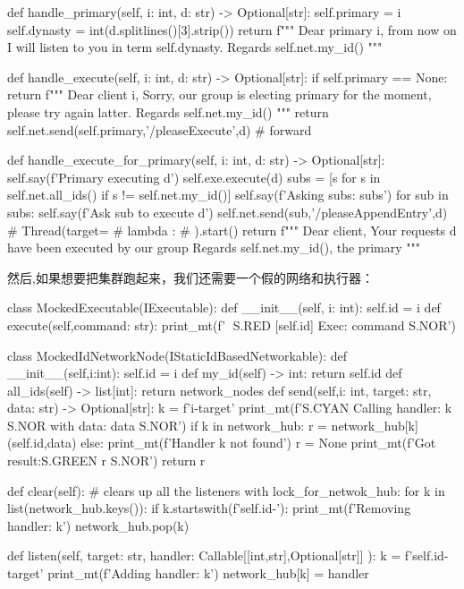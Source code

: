 \begin{simplepy}
    def handle_primary(self, i: int, d: str) -> Optional[str]:
        self.primary = i
        self.dynasty = int(d.splitlines()[3].strip())
        return f"""
        Dear primary {i},
             from now on I will listen to you in term {self.dynasty}.
                      Regards {self.net.my_id()}
        """

    def handle_execute(self, i: int, d: str) -> Optional[str]:
        if self.primary == None:
            return f"""
            Dear client {i},
                Sorry, our group is electing primary for the moment,
                please try again latter.
                    Regards {self.net.my_id()}
            """
        return self.net.send(self.primary,'/pleaseExecute',d)  # forward

    def handle_execute_for_primary(self, i: int, d: str) -> Optional[str]:
        self.say(f'Primary executing {d}')
        self.exe.execute(d)
        subs = [s for s in self.net.all_ids() if s != self.net.my_id()]
        self.say(f'Asking subs: {subs}')
        for sub in subs:
            self.say(f'Ask {sub} to execute {d}')
            self.net.send(sub,'/pleaseAppendEntry',d)
            # Thread(target=
            #        lambda : 
            #        ).start()
        return f"""
        Dear client,
             Your requests {d} have been executed by our group
                  Regards {self.net.my_id()}, the primary
        """
\end{simplepy}
然后,如果想要把集群跑起来，我们还需要一个假的网络和执行器：
\begin{simplepy}
class MockedExecutable(IExecutable):
    def __init__(self, i: int):
        self.id = i
    def execute(self,command: str):
        print_mt(f'🦜 {S.RED} [{self.id}] Exec: {command} {S.NOR}')


class MockedIdNetworkNode(IStaticIdBasedNetworkable):
    def __init__(self,i:int):
        self.id = i
    def my_id(self) -> int:
        return self.id
    def all_ids(self) -> list[int]:
        return network_nodes
    def send(self,i: int, target: str, data: str) -> Optional[str]:
        k = f'{i}-{target}'
        print_mt(f'{S.CYAN} Calling handler: {k} {S.NOR} with data: {data} {S.NOR}')
        if k in network_hub:
            r = network_hub[k](self.id,data)
        else:
            print_mt(f'Handler {k} not found')
            r = None
        print_mt(f'Got result:{S.GREEN} {r} {S.NOR}')
        return r

    def clear(self):                # clears up all the listeners
        with lock_for_netwok_hub:
            for k in list(network_hub.keys()):
                if k.startswith(f'{self.id}-'):
                    print_mt(f'Removing handler: {k}')
                    network_hub.pop(k)

    def listen(self,
               target: str,
               handler: Callable[[int,str],Optional[str]]
               ):
        k = f'{self.id}-{target}'
        print_mt(f'Adding handler: {k}')
        network_hub[k] = handler

\end{simplepy}

